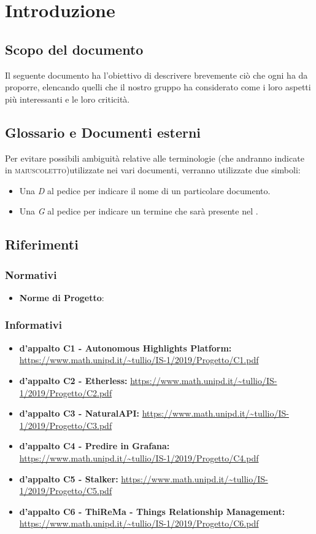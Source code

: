 
\section{Introduzione}
\subsection{Scopo del documento}
  Il seguente documento ha l'obiettivo di descrivere brevemente ciò che ogni   ha da proporre, elencando quelli che il nostro gruppo ha considerato come i loro aspetti più interessanti e le loro criticità. 
\subsection{Glossario e Documenti esterni}
    Per evitare possibili ambiguità relative alle terminologie (che andranno indicate in \textsc{maiuscoletto})utilizzate nei vari documenti, verranno utilizzate due simboli:
    \begin{itemize}
      \item Una \textit{D} al pedice per indicare il nome di un particolare documento.
      \item Una \textit{G} al pedice per indicare un termine che sarà presente nel .
    \end{itemize}   
\subsection{Riferimenti}
    \subsubsection{Normativi}
    \begin{itemize}
      \item \textbf{Norme di Progetto}: 
    \end{itemize}
    \subsubsection{Informativi}
    \begin{itemize}
      \item \textbf{ d'appalto C1 - Autonomous Highlights Platform:} \url{https://www.math.unipd.it/~tullio/IS-1/2019/Progetto/C1.pdf}
      \item \textbf{ d'appalto C2 - Etherless:} \url{https://www.math.unipd.it/~tullio/IS-1/2019/Progetto/C2.pdf}
      \item \textbf{ d'appalto C3 - NaturalAPI:} \url{https://www.math.unipd.it/~tullio/IS-1/2019/Progetto/C3.pdf}
      \item \textbf{ d'appalto C4 - Predire in Grafana:} \url{https://www.math.unipd.it/~tullio/IS-1/2019/Progetto/C4.pdf}
      \item \textbf{ d'appalto C5 - Stalker:} \url{https://www.math.unipd.it/~tullio/IS-1/2019/Progetto/C5.pdf}
      \item \textbf{ d'appalto C6 - ThiReMa - Things Relationship Management:} \url{https://www.math.unipd.it/~tullio/IS-1/2019/Progetto/C6.pdf}
    \end{itemize}
    
  


